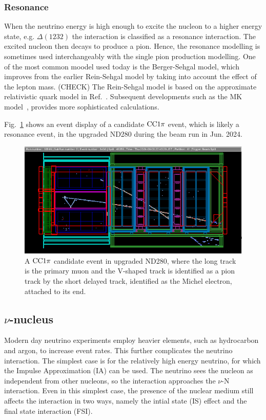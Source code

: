     \subsubsection{Resonance}
    When the neutrino energy is high enough to excite the nucleon to a higher energy state, e.g. $\Delta(1232)$ the interaction is classified as a resonance interaction.
    The excited nucleon then decays to produce a pion. 
    Hence, the resonance modelling is sometimes used interchangeably with the single pion production modelling.
    One of the most common moodel used today is the Berger-Sehgal model, which improves from the earlier Rein-Sehgal model by taking into account the effect of the lepton mass. (CHECK)
    The Rein-Sehgal model is based on the approximate relativistic quark model in Ref.~\cite{Feynman:1971wr}.
    Subsequent developments such as the MK model~\cite{Kabirnezhad:2017jmf,Kabirnezhad:2020wtp,Kabirnezhad:2022znc}, provides more sophisticated calculations.

    Fig.~\ref{fig:cc1pi} shows an event display of a candidate $\textrm{CC}1\pi$ event, which is likely a resonance event, in the upgraded ND280 during the beam run in Jun. 2024.
    \begin{figure}[!htb] 	
        \centering 		
        \includegraphics[width=\sgfigwid\textwidth]{figures/shortME.png}
        \caption{\label{fig:cc1pi} A $\textrm{CC}1\pi$ candidate event in upgraded ND280, where the long track is the primary muon and the V-shaped track is identified as a pion track by the short delayed track, identified as the Michel electron, attached to its end.} 
      \end{figure}
  
  \subsection{$\nu$-nucleus}
  Modern day neutrino experiments employ heavier elements, such as hydrocarbon and argon, to increase event rates.
  This further complicates the neutrino interaction.
  The simplest case is for the relatively high energy neutrino, for which the Impulse Approximation (IA) can be used.
  The neutrino sees the nucleon as independent from other nucleons, so the interaction approaches the $\nu$-N interaction.
  Even in this simplest case, the presence of the nuclear medium still affects the interaction in two ways, namely the intial state (IS) effect and the final state interaction (FSI).

